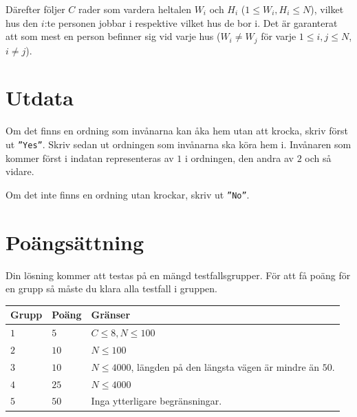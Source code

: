 Därefter följer $C$ rader som vardera heltalen $W_i$ och $H_i$ ($1 \leq W_i,H_i \leq N$), vilket hus
den $i$:te personen jobbar i respektive vilket hus de bor i. Det är garanterat att som mest en person befinner sig vid varje hus ($W_i \neq W_j$ för varje $1 \leq i,j \leq N$, $i \neq j$).

\section*{Utdata}
Om det finns en ordning som invånarna kan åka hem utan att krocka, skriv först ut \texttt{''Yes''}. 
Skriv sedan ut ordningen som invånarna ska köra hem i. Invånaren som kommer först i indatan representeras
av $1$ i ordningen, den andra av $2$ och så vidare.

Om det inte finns en ordning utan krockar, skriv ut \texttt{''No''}.

\section*{Poängsättning}
Din lösning kommer att testas på en mängd testfallsgrupper.
För att få poäng för en grupp så måste du klara alla testfall i gruppen.

\noindent
\begin{tabular}{| l | l | p{12cm} |}
  \hline
  \textbf{Grupp} & \textbf{Poäng} & \textbf{Gränser} \\ \hline
  $1$    & $5$        & $C \leq 8, N \leq 100$ \\ \hline
  $2$    & $10$       & $N \leq 100$ \\ \hline
  $3$    & $10$       & $N \leq 4000$, längden på den längsta vägen är mindre än $50$. \\ \hline
  $4$    & $25$       & $N \leq 4000$ \\ \hline
  $5$    & $50$       & Inga ytterligare begränsningar. \\ \hline
\end{tabular}


